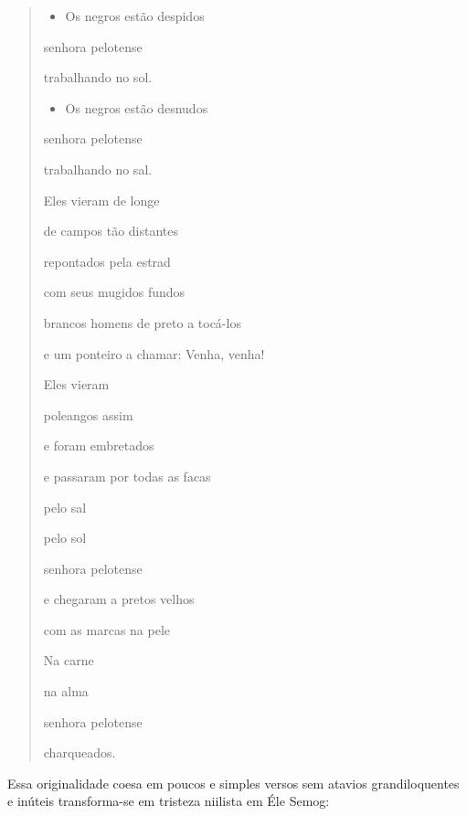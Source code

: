 \documentclass[
  letterpaper,
  DIV=11,
  numbers=noendperiod]{scrreprt}
\providecommand{\tightlist}{%
  \setlength{\itemsep}{0pt}\setlength{\parskip}{0pt}}\usepackage{longtable,booktabs,array}
\begin{document}
\begin{quote}
\begin{itemize}
\tightlist
\item
  Os negros estão despidos~
\end{itemize}

senhora pelotense~

trabalhando no sol.~

\begin{itemize}
\tightlist
\item
  Os negros estão desnudos~
\end{itemize}

senhora pelotense~

trabalhando no sal.~

Eles vieram de longe~

de campos tão distantes~

repontados pela estrad~

com seus mugidos fundos~

brancos homens de preto a tocá-los~

e um ponteiro a chamar: Venha, venha!~

Eles vieram~

poleangos assim~

e foram embretados~

e passaram por todas as facas~

pelo sal~

pelo sol~

senhora pelotense~

e chegaram a pretos velhos~

com as marcas na pele~

Na carne~

na alma~

senhora pelotense~

charqueados.
\end{quote}

Essa originalidade coesa em poucos e simples versos sem atavios
grandiloquentes e inúteis transforma-se em tristeza niilista em Éle
Semog:
\end{document}
